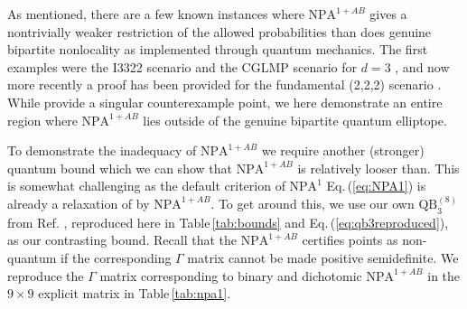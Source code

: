 \documentclass[
  12pt          %
  ,letterpaper  %
  ,center       %
  ,noupper      %
  ,english,fleqn]{uconnthesis}
\newcommand{\ceq}[1]{Eq.\,(\ref{#1})}
\newcommand{\tab}[1]{Table\,\ref{#1}}
\begin{document}
As mentioned, there are a few known instances where $\mbox{NPA}^{1+AB}$ gives a nontrivially weaker restriction of the allowed probabilities than does genuine bipartite nonlocality as implemented through quantum mechanics. The first examples were the I3322 scenario \cite{I3322Original,I3322NPA1,I3322NPA2} and the CGLMP scenario for $d=3$ \cite{CGLMP02,CGLMP08}, and now more recently a proof has been provided for the fundamental (2,2,2) scenario \cite{AlmostQuantum2}. While \citet{AlmostQuantum2} provide a singular counterexample point, we here demonstrate an entire region where $\mbox{NPA}^{1+AB}$ lies outside of the genuine bipartite quantum \gls{elliptope}.

To demonstrate the inadequacy of $\mbox{NPA}^{1+AB}$ we require another (stronger) quantum bound which we can show that $\mbox{NPA}^{1+AB}$ is relatively looser than. This is somewhat challenging as the default criterion of $\mbox{NPA}^1$ \ceq{eq:NPA1} is already a relaxation of  by $\mbox{NPA}^{1+AB}$. To get around this, we use our own $\mbox{QB}_3^{(8)}$ from Ref. \cite{WolfeQB}, reproduced here in \tab{tab:bounds} and \ceq{eq:qb3reproduced}, as our contrasting bound. Recall that the $\mbox{NPA}^{1+AB}$ certifies points as non-quantum if the corresponding $\Gamma$ matrix cannot be made positive semidefinite. We reproduce the $\Gamma$ matrix corresponding to binary and dichotomic $\mbox{NPA}^{1+AB}$ in the $9\times 9$ explicit matrix in \tab{tab:npa1}.
\end{document}
